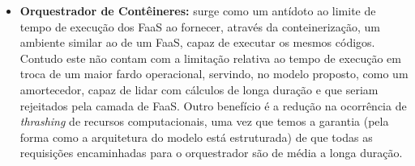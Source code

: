 \documentclass[english,brazilian]{UNISINOSmonografia} %
\begin{document}
\begin{itemize}
\begin{itemize}
		\item \textbf{Orquestrador de Contêineres:}
surge como um antídoto ao limite de tempo de execução dos FaaS ao fornecer, através da conteinerização, um ambiente similar ao de um FaaS, capaz de executar os mesmos códigos.
Contudo este não contam com a limitação relativa ao tempo de execução em troca de um maior fardo operacional, servindo, no modelo proposto, como um amortecedor, capaz de lidar com cálculos de longa duração e que seriam rejeitados pela camada de FaaS. 
Outro benefício é a redução na ocorrência de \textit{thrashing} de recursos computacionais, uma vez que temos a garantia (pela forma como a arquitetura do modelo está estruturada) de que todas as requisições encaminhadas para o orquestrador são de média a longa duração.
		
	\end{itemize}
	
\end{itemize}
\end{document}

